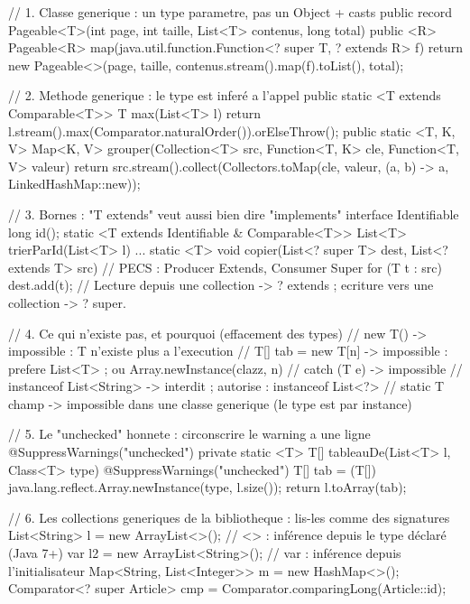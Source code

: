 \begin{codejava}
// 1. Classe generique : un type parametre, pas un Object + casts
public record Pageable<T>(int page, int taille, List<T> contenus, long total) {
    public <R> Pageable<R> map(java.util.function.Function<? super T, ? extends R> f) {
        return new Pageable<>(page, taille, contenus.stream().map(f).toList(), total);
    }
}

// 2. Methode generique : le type est infer\'e a l'appel
public static <T extends Comparable<T>> T max(List<T> l) {
    return l.stream().max(Comparator.naturalOrder()).orElseThrow();
}
public static <T, K, V> Map<K, V> grouper(Collection<T> src, Function<T, K> cle, Function<T, V> valeur) {
    return src.stream().collect(Collectors.toMap(cle, valeur, (a, b) -> a, LinkedHashMap::new));
}

// 3. Bornes : "T extends" veut aussi bien dire "implements"
interface Identifiable { long id(); }
static <T extends Identifiable & Comparable<T>> List<T> trierParId(List<T> l) { ... }
static <T> void copier(List<? super T> dest, List<? extends T> src) {   // PECS : Producer Extends, Consumer Super
    for (T t : src) { dest.add(t); }
}
// Lecture depuis une collection -> ? extends ; ecriture vers une collection -> ? super.

// 4. Ce qui n'existe pas, et pourquoi (effacement des types)
// new T()            -> impossible : T n'existe plus a l'execution
// T[] tab = new T[n] -> impossible : prefere List<T> ; ou Array.newInstance(clazz, n)
// catch (T e)        -> impossible
// instanceof List<String> -> interdit ; autorise : instanceof List<?>
// static T champ     -> impossible dans une classe generique (le type est par instance)

// 5. Le "unchecked" honnete : circonscrire le warning a une ligne
@SuppressWarnings("unchecked")
private static <T> T[] tableauDe(List<T> l, Class<T> type) {
    @SuppressWarnings("unchecked")
    T[] tab = (T[]) java.lang.reflect.Array.newInstance(type, l.size());
    return l.toArray(tab);
}

// 6. Les collections generiques de la bibliotheque : lis-les comme des signatures
List<String> l = new ArrayList<>();          // <> : inf\'erence depuis le type d\'eclar\'e (Java 7+)
var l2 = new ArrayList<String>();             // var : inf\'erence depuis l'initialisateur
Map<String, List<Integer>> m = new HashMap<>();
Comparator<? super Article> cmp = Comparator.comparingLong(Article::id);
\end{codejava}

